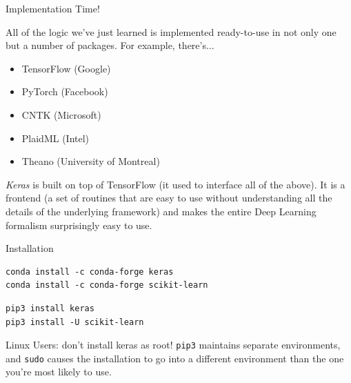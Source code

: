 
\begin{frame}{Implementation Time!}
%
\begin{hintbox}
All of the logic we've just learned is implemented ready-to-use in not only one but a number of packages. For example, there's...
\begin{itemize}
\item TensorFlow (Google)
\item PyTorch (Facebook)
\item CNTK (Microsoft)
\item PlaidML (Intel)
\item Theano (University of Montreal)
\end{itemize}

\emph{Keras} is built on top of TensorFlow (it used to interface all of the above). It is a frontend (\ie a set of routines that are easy to use without understanding all the details of the underlying framework) and makes the entire Deep Learning formalism surprisingly easy to use.
\end{hintbox}
%
\end{frame}


\begin{frame}[fragile]{Installation}
%
\begin{cmdbox}
\begin{verbatim}
conda install -c conda-forge keras
conda install -c conda-forge scikit-learn
\end{verbatim}
\end{cmdbox}
%
\begin{cmdbox}
\begin{verbatim}
pip3 install keras
pip3 install -U scikit-learn
\end{verbatim}
\end{cmdbox}
%
\begin{hintbox}
Linux Users: don't install keras as root! \texttt{pip3} maintains separate environments, and \texttt{sudo} causes the installation to go into a different environment than the one you're most likely to use.
\end{hintbox}
%
\end{frame}

